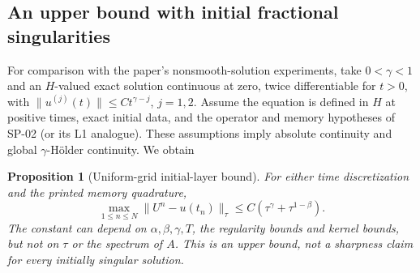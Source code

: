 \documentclass[11pt,a4paper]{amsart}
\theoremstyle{remark}
\theoremstyle{plain}
\newtheorem{proposition}{Proposition}[section]
\theoremstyle{remark}
\numberwithin{equation}{section}
\begin{document}
\subsection{An upper bound with initial fractional singularities}
For comparison with the paper's nonsmooth-solution experiments, take $0<\gamma<1$ and an $H$-valued exact solution continuous at zero, twice differentiable for $t>0$, with $\|u^{(j)}(t)\|\le C t^{\gamma-j}$, $j=1,2$. Assume the equation is defined in $H$ at positive times, exact initial data, and the operator and memory hypotheses of SP-02 (or its L1 analogue). These assumptions imply absolute continuity and global $\gamma$-H\"older continuity. We obtain
\begin{proposition}[Uniform-grid initial-layer bound]\label{prop:tm01-singular}
For either time discretization and the printed memory quadrature,
\[
 \max_{1\le n\le N}\|U^n-u(t_n)\|_\tau
 \le C(\tau^\gamma+\tau^{1-\beta}).
\]
The constant can depend on $\alpha,\beta,\gamma,T$, the regularity bounds and kernel bounds, but not on $\tau$ or the spectrum of $A$. This is an upper bound, not a sharpness claim for every initially singular solution.
\end{proposition}
\end{document}
